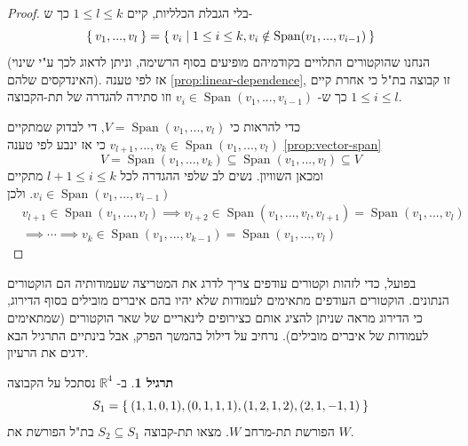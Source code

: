 \documentclass[12pt]{report}
\theoremstyle{plain}
\theoremstyle{definition}
\newtheorem{exercise}{תרגיל}[chapter]
\newcommand{\R}{\mathbb{R}}
\newcommand{\0}{\mathbf{0}}
\DeclareMathOperator{\Span}{Span}
\begin{document}
\begin{proof}
בלי הגבלת הכלליות, קיים
$1\leq l\leq k$
כך ש-
$$
\Set{v_1,...,v_l}=\Set{v_i|1\leq i\leq k, v_i\notin\Span(v_1,...,v_{i-1})}
$$
(הנחנו שהוקטורים התלויים בקודמיהם מופיעים בסוף הרשימה, וניתן לדאוג לכך ע"י שינוי האינדקסים שלהם).
אז לפי טענה
\ref{prop:linear-dependence},
זו קבוצה בת"ל כי אחרת קיים 
$1\leq i\leq l$
כך ש-
$v_i\in\Span(v_1,...,v_{i-1})$
וזו סתירה להגדרה של תת-הקבוצה.

כדי להראות כי
$V=\Span(v_1,...,v_l)$,
די לבדוק שמתקיים
$v_{l+1},...,v_k\in\Span(v_1,...,v_l)$
כי אז ינבע לפי טענה
\ref{prop:vector-span}
$$
V=\Span(v_1,...,v_k)\subseteq\Span(v_1,...,v_l)\subseteq V
$$
ומכאן השוויון. נשים לב שלפי ההגדרה לכל 
$l+1\leq i\leq k$
מתקיים
$v_i\in\Span(v_1,...,v_{i-1})$.
ולכן
$$
\begin{aligned}
&v_{l+1}\in\Span(v_1,...,v_l) \implies v_{l+2}\in\Span(v_1,...,v_l,v_{l+1})=\Span(v_1,...,v_l) \\
&\implies \cdots \implies v_k\in\Span(v_1,...,v_{k-1})=\Span(v_1,...,v_l)
\end{aligned}
$$

\end{proof}

בפועל, כדי לזהות וקטורים עודפים צריך לדרג את המטריצה שעמודותיה הם הוקטורים הנתונים. הוקטורים העודפים מתאימים לעמודות שלא יהיו בהם איברים מובילים בסוף הדירוג, כי הדירוג מראה שניתן להציג אותם כצירופים לינאריים של שאר הוקטורים (שמתאימים לעמודות של איברים מובילים). נרחיב על דילול בהמשך הפרק, אבל בינתיים התרגיל הבא ידגים את הרעיון.

\begin{exercise}
ב-
$\R^4$
נסתכל על הקבוצה
$$S_1=\Set{(1,1,0,1),(0,1,1,1),(1,2,1,2),(2,1,-1,1)}$$
הפורשת תת-מרחב 
$W$.
מצאו תת-קבוצה
$S_2\subseteq S_1$
בת"ל הפורשת את
$W$.
\end{exercise}
\end{document}

